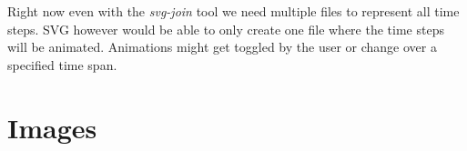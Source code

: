 \documentclass[a4paper, 12pt, bibliography=totoc]{scrartcl}
\begin{document}
Right now even with the \textit{svg-join} tool we need multiple files to represent all time steps. SVG however would be able to only create one file where the time steps will be animated. Animations might get toggled by the user or change over a specified time span.
\newpage
\singlespacing
\appendix
\section{Images}
\end{document}
